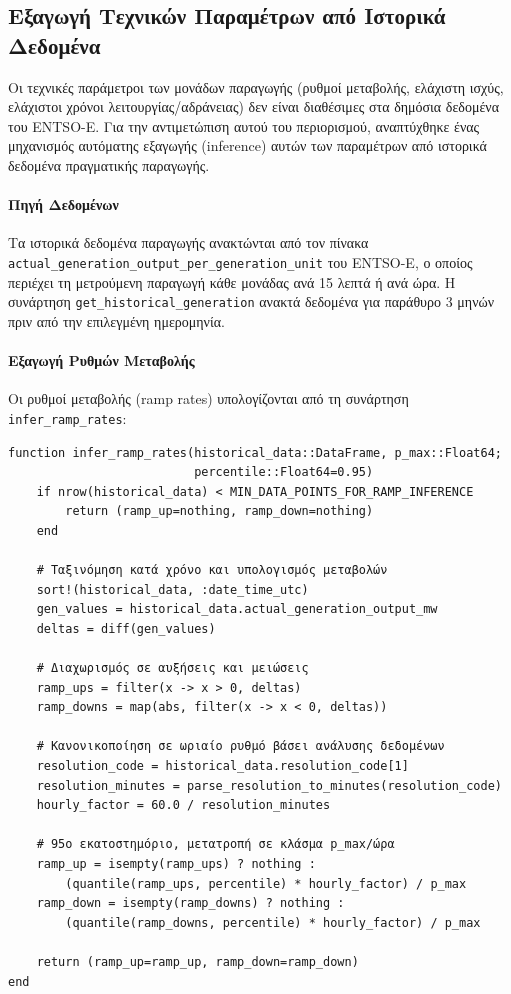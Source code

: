 \subsection{Εξαγωγή Τεχνικών Παραμέτρων από Ιστορικά Δεδομένα}
\label{subsec:parameter-inference}

Οι τεχνικές παράμετροι των μονάδων παραγωγής (ρυθμοί μεταβολής, ελάχιστη ισχύς, ελάχιστοι χρόνοι λειτουργίας/αδράνειας) δεν είναι διαθέσιμες στα δημόσια δεδομένα του ENTSO-E. Για την αντιμετώπιση αυτού του περιορισμού, αναπτύχθηκε ένας μηχανισμός αυτόματης εξαγωγής (inference) αυτών των παραμέτρων από ιστορικά δεδομένα πραγματικής παραγωγής.

\paragraph{Πηγή Δεδομένων}
Τα ιστορικά δεδομένα παραγωγής ανακτώνται από τον πίνακα \texttt{actual\_generation\_output\_per\_generation\_unit} του ENTSO-E, ο οποίος περιέχει τη μετρούμενη παραγωγή κάθε μονάδας ανά 15 λεπτά ή ανά ώρα. Η συνάρτηση \texttt{get\_historical\_generation} ανακτά δεδομένα για παράθυρο 3 μηνών πριν από την επιλεγμένη ημερομηνία.

\paragraph{Εξαγωγή Ρυθμών Μεταβολής}
Οι ρυθμοί μεταβολής (ramp rates) υπολογίζονται από τη συνάρτηση \texttt{infer\_ramp\_rates}:

\begin{samepage}
\begin{verbatim}
function infer_ramp_rates(historical_data::DataFrame, p_max::Float64;
                          percentile::Float64=0.95)
    if nrow(historical_data) < MIN_DATA_POINTS_FOR_RAMP_INFERENCE
        return (ramp_up=nothing, ramp_down=nothing)
    end

    # Ταξινόμηση κατά χρόνο και υπολογισμός μεταβολών
    sort!(historical_data, :date_time_utc)
    gen_values = historical_data.actual_generation_output_mw
    deltas = diff(gen_values)

    # Διαχωρισμός σε αυξήσεις και μειώσεις
    ramp_ups = filter(x -> x > 0, deltas)
    ramp_downs = map(abs, filter(x -> x < 0, deltas))

    # Κανονικοποίηση σε ωριαίο ρυθμό βάσει ανάλυσης δεδομένων
    resolution_code = historical_data.resolution_code[1]
    resolution_minutes = parse_resolution_to_minutes(resolution_code)
    hourly_factor = 60.0 / resolution_minutes

    # 95ο εκατοστημόριο, μετατροπή σε κλάσμα p_max/ώρα
    ramp_up = isempty(ramp_ups) ? nothing :
        (quantile(ramp_ups, percentile) * hourly_factor) / p_max
    ramp_down = isempty(ramp_downs) ? nothing :
        (quantile(ramp_downs, percentile) * hourly_factor) / p_max

    return (ramp_up=ramp_up, ramp_down=ramp_down)
end
\end{verbatim}
\end{samepage}

